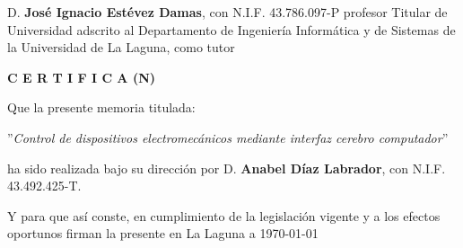 \newpage
\thispagestyle{empty}

D. {\bf José Ignacio Estévez Damas}, con N.I.F. 43.786.097-P profesor Titular de Universidad adscrito al Departamento de Ingenier\'ia Inform\'atica y de Sistemas de la Universidad de La Laguna, como tutor


\bigskip
\bigskip
{\bf C E R T I F I C A (N)}

\bigskip
\bigskip
Que la presente memoria titulada:

\bigskip
''{\it Control de dispositivos electromec\'anicos mediante interfaz cerebro computador}''

\bigskip
\bigskip
\bigskip

\noindent ha sido realizada bajo su dirección por D. {\bf Anabel D\'iaz Labrador},
con N.I.F. 43.492.425-T.

\bigskip
\bigskip

Y para que así conste, en cumplimiento de la legislación vigente y a los efectos
oportunos firman la presente en La Laguna a \today